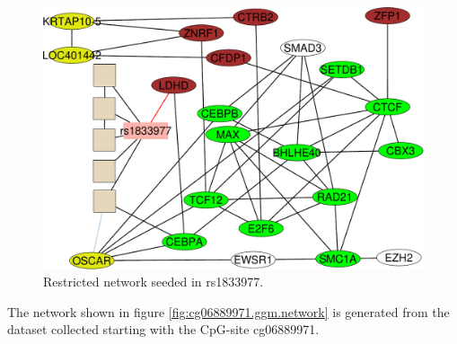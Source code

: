 \documentclass[a4paper,12pt,twoside,openright]{article}
\begin{document}
\begin{figure}[tb]
	\includegraphics[scale = 0.6, keepaspectratio = true]{"../figures/rs1833977"}  
	\caption{Restricted network seeded in rs1833977. }
    \label{fig:rs1833977.ggm.network}
\end{figure}



The network shown in figure \ref{fig:cg06889971.ggm.network} is generated from the dataset collected starting with the CpG-site cg06889971. 
\end{document}
